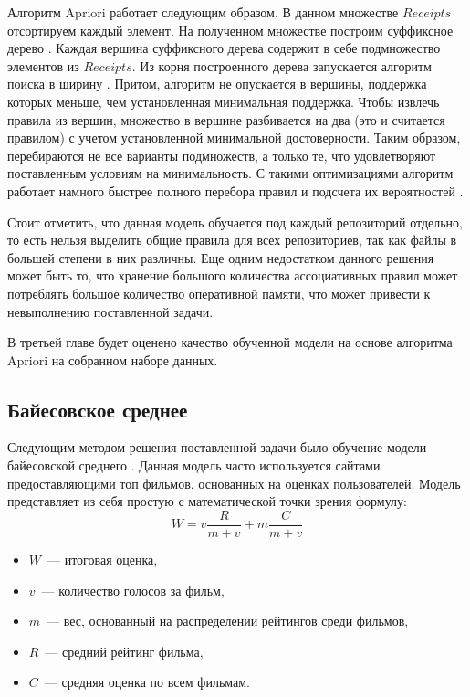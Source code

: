 Алгоритм Apriori работает следующим образом. В данном множестве $Receipts$ отсортируем каждый элемент. На полученном множестве построим суффиксное дерево \cite{trie}. Каждая вершина суффиксного дерева содержит в себе подмножество элементов из $Receipts$. Из корня построенного дерева запускается алгоритм поиска в ширину \cite{alghorithms}. Притом, алгоритм не опускается в вершины, поддержка которых меньше, чем установленная минимальная поддержка. Чтобы извлечь правила из вершин, множество в вершине разбивается на два (это и считается правилом) с учетом установленной минимальной достоверности. Таким образом, перебираются не все варианты подмножеств, а только те, что удовлетворяют поставленным условиям на минимальность. С такими оптимизациями алгоритм работает намного быстрее полного перебора правил и подсчета их вероятностей \cite{apriori}. 

Стоит отметить, что данная модель обучается под каждый репозиторий отдельно, то есть нельзя выделить общие правила для всех репозиториев, так как файлы в большей степени в них различны. Еще одним недостатком данного решения может быть то, что хранение большого количества ассоциативных правил может потреблять большое количество оперативной памяти, что может привести к невыполнению поставленной задачи.

В третьей главе будет оценено качество обученной модели на основе алгоритма Apriori на собранном наборе данных.
    \subsection{Байесовское среднее}\label{chapter-2-bayes}
Следующим методом решения поставленной задачи было обучение модели байесовской среднего \cite{bayesian-average}. Данная модель часто используется сайтами предоставляющими топ фильмов, основанных на оценках пользователей. Модель представляет из себя простую с математической точки зрения формулу:
    \begin{equation}\label{bayes-formula}
        W = v\frac{R}{m + v} + m\frac{C}{m + v}    
    \end{equation}

    \begin{itemize}
        \item $W$~--- итоговая оценка,
        \item $v$~--- количество голосов за фильм,
        \item $m$~--- вес, основанный на распределении рейтингов среди фильмов,
        \item $R$~--- средний рейтинг фильма,
        \item ${C}$~--- средняя оценка по всем фильмам.
    \end{itemize}

